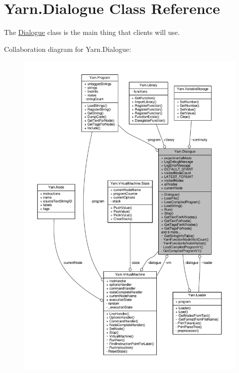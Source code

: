 \hypertarget{a00092}{\section{Yarn.\-Dialogue Class Reference}
\label{a00092}
}


The \hyperlink{a00092}{Dialogue} class is the main thing that clients will use.  




Collaboration diagram for Yarn.\-Dialogue\-:
\nopagebreak
\begin{figure}[H]
\begin{center}
\leavevmode
\includegraphics[width=350pt]{a00618}
\end{center}
\end{figure}
